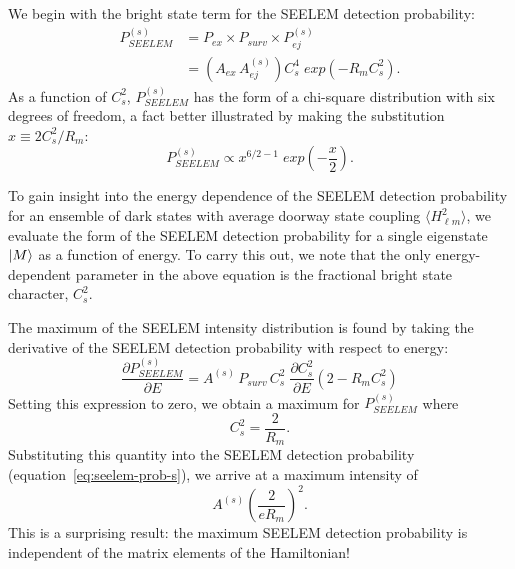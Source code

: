 \documentclass[12pt]{mitthesis}
\newcommand{\TODO} [1]{\textcolor{magenta}{\textbf{TODO:} #1}}
\begin{document}
We begin with the bright state term for the SEELEM detection probability:
\begin{equation}
  \label{eq:seelem-prob-s}
  \begin{split}
    P_{SEELEM}^{(s)} &= P_{ex} \times P_{surv} \times P_{ej}^{(s)}\\
    &= \left( A_{ex} \, A_{ej}^{(s)} \right) C_s^4 \; exp \left( -R_m
      C_s^2 \right).
  \end{split}
\end{equation}
As a function of $C_s^2$, $P_{SEELEM}^{(s)}$ has the form of a
chi-square distribution with six degrees of freedom, a fact
better illustrated by making the substitution $x \equiv 2 C_s^2 /
R_m$:
\begin{equation}
  \label{eq:seelem-prob-chisq}
  P_{SEELEM}^{(s)} \propto x^{6/2 - 1} \; exp \left( - \frac{x}{2} \right).
\end{equation}


To gain insight into the energy dependence of the SEELEM detection
probability for an ensemble of dark states with average doorway state
coupling $\langle H_{\ell m}^2 \rangle$, we evaluate the form of the
SEELEM detection probability for a single eigenstate $\mathinner{|{M}\rangle}$ as a
function of energy.  To carry this out, we note that the only
energy-dependent parameter in the above equation is the fractional
bright state character, $C_s^2$.

The maximum of the SEELEM intensity distribution is found by taking
the derivative of the SEELEM detection probability with respect to
energy:
\begin{equation}
    \frac{\partial P_{SEELEM}^{(s)}}{\partial E} = 
       A^{(s)} \, P_{surv} \, C_s^2 \; \frac{\partial C_s^2}{\partial E} 
       \left( 2 - R_m C_s^2 \right)
\end{equation}
Setting this expression to zero, we obtain a maximum for
$P_{SEELEM}^{(s)}$ where
\begin{equation}
  C_s^2 = \frac{2}{R_m}.
\end{equation}
Substituting this quantity into the SEELEM detection probability
(equation~\ref{eq:seelem-prob-s}), we arrive at a maximum intensity of
\begin{equation}\label{eq:seelem-max-s}
  A^{(s)} \left( \frac{2}{e R_m} \right)^2.
\end{equation}
This is a surprising result: the maximum SEELEM detection probability
is independent of the matrix elements of the Hamiltonian! 
\end{document}
